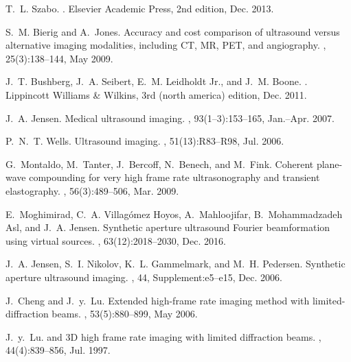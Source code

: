 \documentclass[10pt,twocolumn,romanappendices,final]{IEEEtran}
\begin{document}

\begin{thebibliography}{100}

T.~L. Szabo.
.
\newblock Elsevier Academic Press, 2nd edition, Dec. 2013.

S.~M. Bierig and A.~Jones.
\newblock Accuracy and cost comparison of ultrasound versus alternative imaging
  modalities, including {CT}, {MR}, {PET}, and angiography.
, 25(3):138--144, May 2009.

J.~T. Bushberg, J.~A. Seibert, E.~M. {Leidholdt Jr.}, and J.~M. Boone.
.
\newblock Lippincott Williams \& Wilkins, 3rd (north america) edition, Dec.
  2011.

J.~A. Jensen.
\newblock Medical ultrasound imaging.
, 93(1--3):153--165, Jan.--Apr. 2007.

P.~N.~T. Wells.
\newblock Ultrasound imaging.
, 51(13):R83--R98, Jul. 2006.

G.~Montaldo, M.~Tanter, J.~Bercoff, N.~Benech, and M.~Fink.
\newblock Coherent plane-wave compounding for very high frame rate
  ultrasonography and transient elastography.
,
  56(3):489--506, Mar. 2009.

E.~Moghimirad, C.~A. {Villagómez Hoyos}, A.~Mahloojifar, B.~{Mohammadzadeh
  Asl}, and J.~A. Jensen.
\newblock Synthetic aperture ultrasound {F}ourier beamformation using virtual
  sources.
,
  63(12):2018--2030, Dec. 2016.

J.~A. Jensen, S.~I. Nikolov, K.~L. Gammelmark, and M.~H. Pedersen.
\newblock Synthetic aperture ultrasound imaging.
, 44, Supplement:e5--e15, Dec. 2006.

J.~Cheng and J.~y.~Lu.
\newblock Extended high-frame rate imaging method with limited-diffraction
  beams.
,
  53(5):880--899, May 2006.

J.~y.~Lu.
 and {3D} high frame rate imaging with limited diffraction beams.
,
  44(4):839--856, Jul. 1997.


\end{thebibliography}
\end{document}

